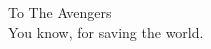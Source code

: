 \begin{dedication}
{\large To The Avengers}\\[5mm]
You know, for saving the world.
\end{dedication}
